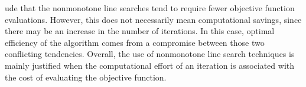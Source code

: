 ude that the nonmonotone line searches tend to require fewer objective function evaluations.
However, this does not necessarily mean computational savings, since there may be an increase in the number of iterations.
In this case, optimal efficiency of the algorithm comes from a compromise between those two conflicting tendencies.
Overall, the use of nonmonotone line search techniques is mainly justified when the computational effort of an iteration is associated with the cost of evaluating the objective function.


